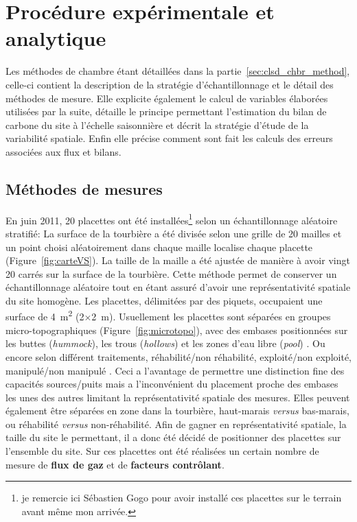 \section{Procédure expérimentale et analytique}

Les méthodes de chambre étant détaillées dans la partie~\ref{sec:clsd_chbr_method}, celle-ci contient la description de la stratégie d'échantillonnage et le détail des méthodes de mesure.
Elle explicite également le calcul de variables élaborées utilisées par la suite, détaille le principe permettant l'estimation du bilan de carbone du site à l'échelle saisonnière et décrit la stratégie d'étude de la variabilité spatiale.
Enfin elle précise comment sont fait les calculs des erreurs associées aux flux et bilans.

\subsection{Méthodes de mesures}

En juin 2011, 20 placettes ont été installées\footnote{je remercie ici Sébastien Gogo pour avoir installé ces placettes sur le terrain avant même mon arrivée.} selon un échantillonnage aléatoire stratifié:
La surface de la tourbière a été divisée selon une grille de 20 mailles et un point choisi aléatoirement dans chaque maille localise chaque placette (Figure~\ref{fig:carteVS}).
La taille de la maille a été ajustée de manière à avoir vingt 20 carrés sur la surface de la tourbière.
Cette méthode permet de conserver un échantillonnage aléatoire tout en étant assuré d'avoir une représentativité spatiale du site homogène. 
Les placettes, délimitées par des piquets, occupaient une surface de \SI{4}{\square\metre} (2$\times$\SI{2}{\metre}).
Usuellement les placettes sont séparées en groupes micro-topographiques (Figure~\ref{fig:microtopo}), avec des embases positionnées sur les buttes (\textit{hummock}), les trous (\textit{hollows}) et les zones d'eau libre (\textit{pool}) \citep{Alm1997,waddington2000}.
Ou encore selon différent traitements, réhabilité/non réhabilité, exploité/non exploité, manipulé/non manipulé \citep{bortoluzzi2006a,strack2013}.
Ceci a l'avantage de permettre une distinction fine des capacités sources/puits mais a l'inconvénient du placement proche des embases les unes des autres limitant la représentativité spatiale des mesures.
Elles peuvent également être séparées en zone dans la tourbière, haut-marais \textit{versus} bas-marais, ou réhabilité \textit{versus} non-réhabilité.
Afin de gagner en représentativité spatiale, la taille du site le permettant, il a donc été décidé de positionner des placettes sur l'ensemble du site.
Sur ces placettes ont été réalisées un certain nombre de mesure de \textbf{flux de gaz} et de \textbf{facteurs contrôlant}.

